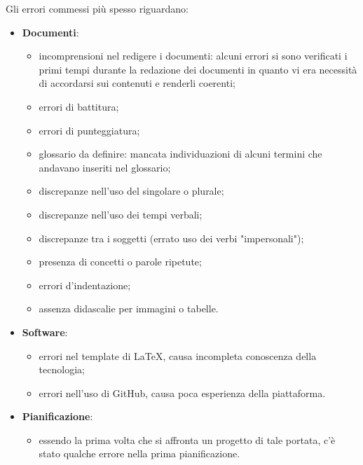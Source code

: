 \documentclass[../piano_di_qualifica.tex]{subfiles}
\begin{document}
Gli errori commessi più spesso riguardano:

\begin{itemize}

	\item \textbf{Documenti}:
	      \begin{itemize}
		      \item incomprensioni nel redigere i documenti: alcuni errori si sono verificati i primi tempi durante la redazione dei documenti in quanto vi era necessità di accordarsi sui contenuti e renderli coerenti;
		      \item errori di battitura;
		      \item errori di punteggiatura;
		      \item glossario da definire: mancata individuazioni di alcuni termini che andavano inseriti nel glossario;
		      \item discrepanze nell'uso del singolare o plurale;
		      \item discrepanze nell'uso dei tempi verbali;
		      \item discrepanze tra i soggetti (errato uso dei verbi "impersonali");
		      \item presenza di concetti o parole ripetute;
		      \item errori d'indentazione;
		      \item assenza didascalie per immagini o tabelle.
	      \end{itemize}

	\item \textbf{Software}:
	      \begin{itemize}
		      \item errori nel template di \LaTeX, causa incompleta conoscenza della tecnologia;
		      \item errori nell'uso di GitHub, causa poca esperienza della piattaforma.
	      \end{itemize}

	\item \textbf{Pianificazione}:
	      \begin{itemize}
		      \item essendo la prima volta che si affronta un progetto di tale portata, c'è stato qualche errore nella prima pianificazione.
	      \end{itemize}

\end{itemize}
\end{document}
